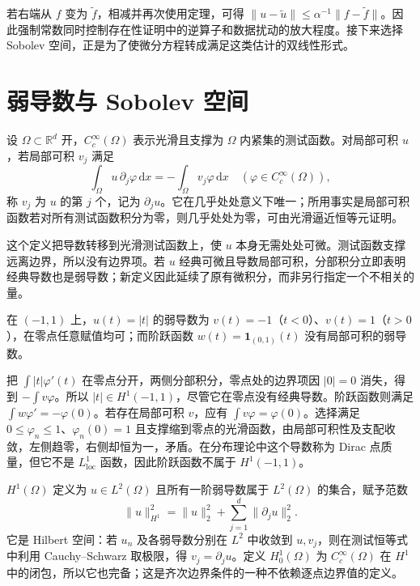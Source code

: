 \documentclass[UTF8,12pt,a4paper,fontset=fandol]{ctexbook}
\begin{document}
若右端从 $f$ 变为 $\widetilde f$，相减并再次使用定理，可得 $\|u-\widetilde u\|\leq\alpha^{-1}\|f-\widetilde f\|$。因此强制常数同时控制存在性证明中的逆算子和数据扰动的放大程度。接下来选择 Sobolev 空间，正是为了使微分方程转成满足这类估计的双线性形式。

\section{弱导数与 Sobolev 空间}
设 $\Omega\subset\mathbb R^d$ 开，$C_c^\infty(\Omega)$ 表示光滑且支撑为 $\Omega$ 内紧集的测试函数。对局部可积 $u$，若局部可积 $v_j$ 满足
\[
 \int_\Omega u\,\partial_j\varphi\,\mathrm dx
 =-\int_\Omega v_j\varphi\,\mathrm dx
 \quad(\varphi\in C_c^\infty(\Omega)),
\]
称 $v_j$ 为 $u$ 的第 $j$ 个，记为 $\partial_ju$。它在几乎处处意义下唯一；所用事实是局部可积函数若对所有测试函数积分为零，则几乎处处为零，可由光滑逼近恒等元证明。

这个定义把导数转移到光滑测试函数上，使 $u$ 本身无需处处可微。测试函数支撑远离边界，所以没有边界项。若 $u$ 经典可微且导数局部可积，分部积分立即表明经典导数也是弱导数；新定义因此延续了原有微积分，而非另行指定一个不相关的量。

\begin{example}
在 $(-1,1)$ 上，$u(t)=|t|$ 的弱导数为 $v(t)=-1$（$t<0$）、$v(t)=1$（$t>0$），在零点任意赋值均可；而阶跃函数 $w(t)=\mathbf1_{(0,1)}(t)$ 没有局部可积的弱导数。
\end{example}
\begin{solve}
把 $\int |t|\varphi'(t)$ 在零点分开，两侧分部积分，零点处的边界项因 $|0|=0$ 消失，得到 $-\int v\varphi$。所以 $|t|\in H^1(-1,1)$，尽管它在零点没有经典导数。阶跃函数则满足 $\int w\varphi'=-\varphi(0)$。若存在局部可积 $v$，应有 $\int v\varphi=\varphi(0)$。选择满足 $0\leq\varphi_n\leq1$、$\varphi_n(0)=1$ 且支撑缩到零点的光滑函数，由局部可积性及支配收敛，左侧趋零，右侧却恒为一，矛盾。在分布理论中这个导数称为 Dirac 点质量，但它不是 $L^1_{\mathrm{loc}}$ 函数，因此阶跃函数不属于 $H^1(-1,1)$。
\end{solve}

$H^1(\Omega)$ 定义为 $u\in L^2(\Omega)$ 且所有一阶弱导数属于 $L^2(\Omega)$ 的集合，赋予范数
\[
 \|u\|_{H^1}^2=\|u\|_2^2+\sum_{j=1}^d\|\partial_ju\|_2^2.
\]
它是 Hilbert 空间：若 $u_n$ 及各弱导数分别在 $L^2$ 中收敛到 $u,v_j$，则在测试恒等式中利用 Cauchy--Schwarz 取极限，得 $v_j=\partial_ju$。定义 $H_0^1(\Omega)$ 为 $C_c^\infty(\Omega)$ 在 $H^1$ 中的闭包，所以它也完备；这是齐次边界条件的一种不依赖逐点边界值的定义。
\end{document}
